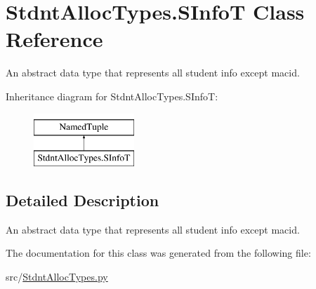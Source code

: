 \hypertarget{class_stdnt_alloc_types_1_1_s_info_t}{}\section{Stdnt\+Alloc\+Types.\+S\+InfoT Class Reference}
\label{class_stdnt_alloc_types_1_1_s_info_t}


An abstract data type that represents all student info except macid.  


Inheritance diagram for Stdnt\+Alloc\+Types.\+S\+InfoT\+:\begin{figure}[H]
\begin{center}
\leavevmode
\includegraphics[height=2.000000cm]{class_stdnt_alloc_types_1_1_s_info_t}
\end{center}
\end{figure}


\subsection{Detailed Description}
An abstract data type that represents all student info except macid. 

The documentation for this class was generated from the following file\+:\begin{DoxyCompactItemize}
\item 
src/\mbox{\hyperlink{_stdnt_alloc_types_8py}{Stdnt\+Alloc\+Types.\+py}}\end{DoxyCompactItemize}

